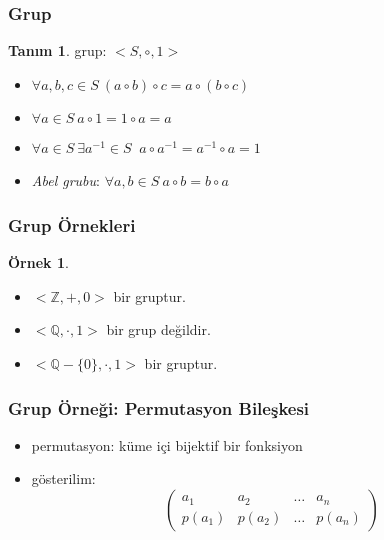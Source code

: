 \documentclass[dvipsnames]{beamer}
\theoremstyle{definition}
\newtheorem{tanim}[theorem]{Tanım}
\theoremstyle{example}
\newtheorem{ornek}[theorem]{Örnek}
\theoremstyle{plain}
\begin{document}
\begin{frame}
  \frametitle{Grup}

  \begin{tanim}
    \alert{grup}: $<S,\circ,1>$

    \begin{itemize}
      \item $\forall a,b,c \in S~(a \circ b) \circ c = a \circ (b \circ c)$
      \item $\forall a \in S~a \circ 1 = 1 \circ a = a$
      \item $\forall a \in S~\exists a^{-1} \in S~$
        $a \circ a^{-1} = a^{-1} \circ a = 1$

      \pause
      \medskip
      \item \emph{Abel grubu}: $\forall a,b \in S~a \circ b = b \circ a$
    \end{itemize}
  \end{tanim}
\end{frame}

\begin{frame}
  \frametitle{Grup Örnekleri}

  \begin{ornek}
    \begin{itemize}
      \item  $<\mathbb{Z},+,0>$ bir gruptur.

      \pause
      \medskip
      \item $<\mathbb{Q},\cdot,1>$ bir grup değildir.
      \item $<\mathbb{Q}-\{0\},\cdot,1>$ bir gruptur.
    \end{itemize}
  \end{ornek}
\end{frame}

\begin{frame}
  \frametitle{Grup Örneği: Permutasyon Bileşkesi}

  \begin{itemize}
    \item permutasyon: küme içi bijektif bir fonksiyon

    \medskip
    \item gösterilim:
    \[\left(
      \begin{array}{cccc}
         a_1   &  a_2   & \dots &  a_n\\
        p(a_1) & p(a_2) & \dots & p(a_n)
      \end{array}
    \right)\]
  \end{itemize}
\end{frame}
\end{document}

